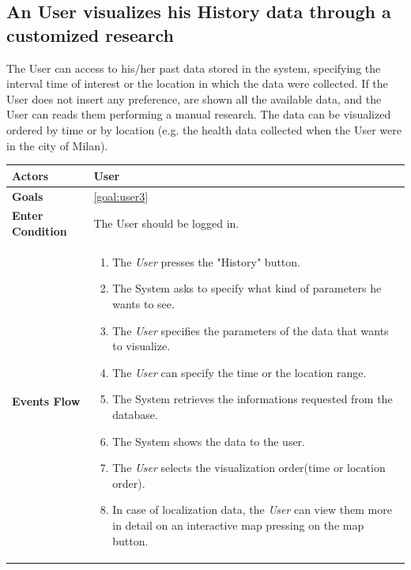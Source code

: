  \subsection{An User visualizes his History data through a customized research}
 
The User can access to his/her past data stored in the system, specifying the interval time of interest or the location in which the data were collected. If the User does not insert any preference, are shown all the available data, and the User can reads them performing a manual research.
The data can be visualized ordered by time or by location (e.g. the health data collected when the User were in the city of Milan).

\begin{table}[H]
	\centering
    
    \begin{tabular}{|p{3.5cm}|p{10.3cm}|}
    
    \hline
    
    \textbf{\large{Actors}}  			& \tabitem  User  				\\
    				 	
    \hline
    
    \textbf{\large{Goals}} 				&\ref{goal:user3}\\
    
     \hline
     
    \textbf{\large{Enter Condition}} & The User should be logged in.\\
    
    \hline
    \textbf{\large{Events Flow}}		& \begin{enumerate}[leftmargin=0.5cm]
                                          	\item The \emph{User}  presses the "History" button.
                                            \item The System asks to specify what kind of parameters he wants to see.
                                            \item The \emph{User} specifies the parameters of the data that wants to visualize.
                                            \item The \emph{User} can specify the time or the location range. 
                                            \item The System retrieves the informations requested from the database.
                                            \item The System shows the data to the user.
                                            \item The \emph{User} selects the visualization order(time or location order).
                                            \item In case of localization data, the \emph{User} can view them more in detail on an interactive map pressing on the map button.            \end{enumerate}\\
                                            

\end{tabular}
\end{table}
